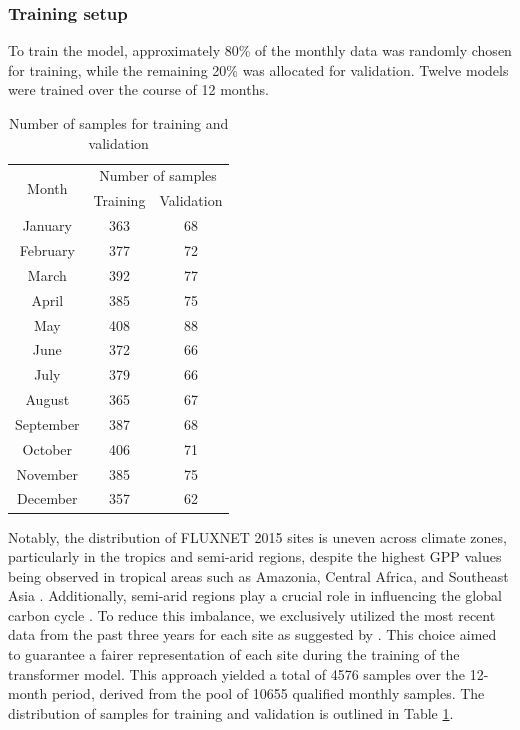 \subsubsection{Training setup}
To train the model, approximately 80\% of the monthly data was randomly chosen for training, while the remaining 20\% was allocated for validation. Twelve models were trained over the course of 12 months. \par
\begin{table}[!ht]
    \centering
    \caption{Number of samples for training and validation}
    \begin{tabular}{ccc}
        \hline
        \multirow{2}{*}{Month} & \multicolumn{2}{c}{Number of samples} \\ \cline{2-3}
        ~ & Training & Validation \\ \hline
        January & 363 & 68 \\ 
        February & 377 & 72 \\ 
        March & 392 & 77 \\ 
        April & 385 & 75 \\ 
        May & 408 & 88 \\ 
        June & 372 & 66 \\ 
        July & 379 & 66 \\ 
        August & 365 & 67 \\ 
        September & 387 & 68 \\ 
        October & 406 & 71 \\ 
        November & 385 & 75 \\ 
        December & 357 & 62 \\ \hline
    \end{tabular}
    \label{tab:chap6_nosamples}
\end{table}

Notably, the distribution of FLUXNET 2015 sites is uneven across climate zones, particularly in the tropics and semi-arid regions, despite the highest GPP values being observed in tropical areas such as Amazonia, Central Africa, and Southeast Asia \citep{chen2017regional}. Additionally, semi-arid regions play a crucial role in influencing the global carbon cycle \citep{poulter2014contribution}. To reduce this imbalance, we exclusively utilized the most recent data from the past three years for each site as suggested by \citep{zeng2020global}. This choice aimed to guarantee a fairer representation of each site during the training of the transformer model. This approach yielded a total of 4576 samples over the 12-month period, derived from the pool of 10655 qualified monthly samples. The distribution of samples for training and validation is outlined in Table \ref{tab:chap6_nosamples}. \par
